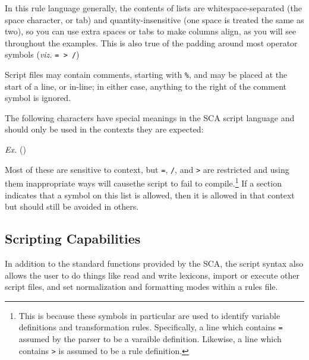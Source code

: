\documentclass[10pt,letterpaper]{article}
\newcounter{excounter}
\newenvironment{vex}[1]{
	\refstepcounter{excounter}
	\noindent\emph{Ex.} (\arabic{excounter}\label{#1})
	\verbatim
}{\endverbatim}
\begin{document}
In this rule language generally, the contents of lists are whitespace-separated (the space character, or tab) and quantity-insensitive (one space is treated the same as two), so you can use extra spaces or tabs to make columns align, as you will see throughout the examples. This is also true of the padding around most operator symbols (\emph{viz.} \texttt{= > /})


Script files may contain comments, starting with \texttt{\%}, and may be placed at the start of a line, or in-line; in either case, anything to the right of the comment symbol is ignored.

The following characters have special meanings in the SCA script language and should only be used in the contexts they are expected:

\begin{vex}{ex:reserved}
\end{vex}
\noindent
Most of these are sensitive to context, but \texttt{=}, \texttt{/}, and \texttt{>} are restricted and using them inappropriate ways will causethe script to  fail to compile.\footnote{This is because these symbols in particular are used to identify variable definitions and transformation rules. Specifically, a line which contains \texttt{=} assumed by the parser to be a varaible definition. Likewise, a line which contains \texttt{>} is assumed to be a rule definition.} If a section indicates that a symbol on this list is allowed, then it is allowed in that context but should still be avoided in others.


\subsection{Scripting Capabilities}
\label{sec:scripting_capabilities}
In addition to the standard functions provided by the SCA, the script syntax also allows the user to do things like read and write lexicons, import or execute other script files, and set normalization and formatting modes within a rules file.

\end{document}
